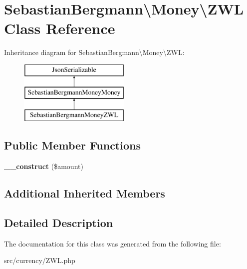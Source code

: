 \hypertarget{classSebastianBergmann_1_1Money_1_1ZWL}{}\section{Sebastian\+Bergmann\textbackslash{}Money\textbackslash{}Z\+W\+L Class Reference}
\label{classSebastianBergmann_1_1Money_1_1ZWL}
Inheritance diagram for Sebastian\+Bergmann\textbackslash{}Money\textbackslash{}Z\+W\+L\+:\begin{figure}[H]
\begin{center}
\leavevmode
\includegraphics[height=3.000000cm]{classSebastianBergmann_1_1Money_1_1ZWL}
\end{center}
\end{figure}
\subsection*{Public Member Functions}
\begin{DoxyCompactItemize}
\item 
\hypertarget{classSebastianBergmann_1_1Money_1_1ZWL_acf8fce343213e4a6f6e1b4ab931ee673}{}{\bfseries \+\_\+\+\_\+construct} (\$amount)\label{classSebastianBergmann_1_1Money_1_1ZWL_acf8fce343213e4a6f6e1b4ab931ee673}

\end{DoxyCompactItemize}
\subsection*{Additional Inherited Members}


\subsection{Detailed Description}


The documentation for this class was generated from the following file\+:\begin{DoxyCompactItemize}
\item 
src/currency/Z\+W\+L.\+php\end{DoxyCompactItemize}
